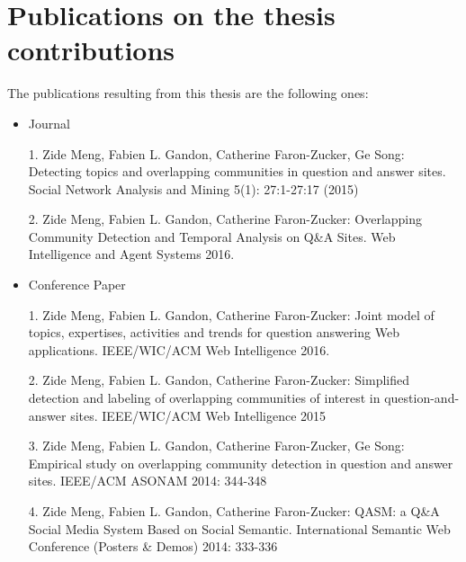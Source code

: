 \section{Publications on the thesis contributions}
The publications resulting from this thesis are the following ones:

\begin{itemize}

\item{Journal} 


1. Zide Meng, Fabien L. Gandon, Catherine Faron-Zucker, Ge Song: Detecting topics and overlapping communities in question and answer sites. Social Network Analysis and Mining 5(1): 27:1-27:17 (2015)

2. Zide Meng, Fabien L. Gandon, Catherine Faron-Zucker: Overlapping Community Detection and Temporal Analysis on Q\&A Sites. Web Intelligence and Agent Systems 2016. 

\item{Conference Paper}

1. Zide Meng, Fabien L. Gandon, Catherine Faron-Zucker: Joint model of topics, expertises, activities and trends for question answering Web applications. IEEE/WIC/ACM Web Intelligence 2016.


2. Zide Meng, Fabien L. Gandon, Catherine Faron-Zucker: Simplified detection and labeling of overlapping communities of interest in question-and-answer sites. IEEE/WIC/ACM Web Intelligence 2015

3. Zide Meng, Fabien L. Gandon, Catherine Faron-Zucker, Ge Song: Empirical study on overlapping community detection in question and answer sites. IEEE/ACM ASONAM 2014: 344-348

4. Zide Meng, Fabien L. Gandon, Catherine Faron-Zucker: QASM: a Q\&A Social Media System Based on Social Semantic. International Semantic Web Conference (Posters \& Demos) 2014: 333-336

\end{itemize}






